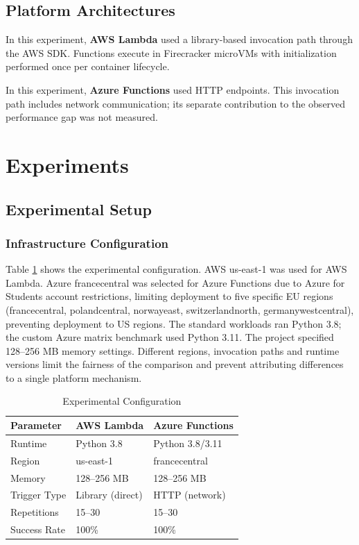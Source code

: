 \documentclass[sigconf,nonacm]{acmart}
\begin{document}
\subsection{Platform Architectures}

In this experiment, \textbf{AWS Lambda} used a library-based invocation path through the AWS SDK. Functions execute in Firecracker microVMs with initialization performed once per container lifecycle.

In this experiment, \textbf{Azure Functions} used HTTP endpoints. This invocation path includes network communication; its separate contribution to the observed performance gap was not measured.

\section{Experiments}

\subsection{Experimental Setup}

\subsubsection{Infrastructure Configuration}

Table \ref{tab:config} shows the experimental configuration. AWS us-east-1 was used for AWS Lambda. Azure francecentral was selected for Azure Functions due to Azure for Students account restrictions, limiting deployment to five specific EU regions (francecentral, polandcentral, norwayeast, switzerlandnorth, germanywestcentral), preventing deployment to US regions. The standard workloads ran Python 3.8; the custom Azure matrix benchmark used Python 3.11. The project specified 128--256 MB memory settings. Different regions, invocation paths and runtime versions limit the fairness of the comparison and prevent attributing differences to a single platform mechanism.

\begin{table}[ht]
\centering
\caption{Experimental Configuration}
\label{tab:config}
\begin{tabular}{@{}lll@{}}
\toprule
\textbf{Parameter} & \textbf{AWS Lambda} & \textbf{Azure Functions} \\ \midrule
Runtime & Python 3.8 & Python 3.8/3.11 \\
Region & us-east-1 & francecentral \\
Memory & 128--256 MB & 128--256 MB \\
Trigger Type & Library (direct) & HTTP (network) \\
Repetitions & 15--30 & 15--30 \\
Success Rate & 100\% & 100\% \\ \bottomrule
\end{tabular}
\end{table}
\end{document}
